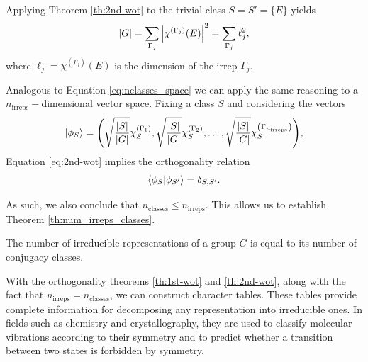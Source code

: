 \begin{corollary} \label{coro:chi_E}
Applying Theorem \ref{th:2nd-wot} to the trivial class $S = S' = \{E\}$ yields
\begin{equation} \label{eq:chi_E_coro}
\abs{G} = \sum_{\Gamma_j} \abs{\chi^{(\Gamma_j)}(E)}^2 = \sum_{\Gamma_j} \ell_j^2,
\end{equation}
where $\ell_j = \chi^{(\Gamma_j)}(E)$ is the dimension of the irrep $\Gamma_j$.
\end{corollary}

Analogous to Equation \ref{eq:nclasses_space} we can apply the same reasoning to a $n_{\text{irreps}}-$dimensional vector space. Fixing a class $S$ and considering the vectors
\begin{equation} \label{eq:nirreps_space}
\ket{\phi_{S}} =
\qty(
\sqrt{\frac{\abs{S}}{\abs{G}}} \chi^{(\Gamma_1)}_{S},
\sqrt{\frac{\abs{S}}{\abs{G}}} \chi^{(\Gamma_2)}_{S},
\ldots,
\sqrt{\frac{\abs{S}}{\abs{G}}} \chi^{\qty(\Gamma_{n_{\text{irreps}}})}_{S}
),
\end{equation}
Equation \ref{eq:2nd-wot} implies the orthogonality relation
\begin{equation} \label{eq:orthog_phis_classes}
\braket{\phi_{S}}{\phi_{S'}} = \delta_{S, S'}.
\end{equation}

As such, we also conclude that $n_{\text{classes}} \leq n_{\text{irreps}}$. This allows us to establish Theorem \ref{th:num_irreps_classes}.

\begin{theorem}[$\bm{n_{\textbf{irreps}} = n_{\textbf{classes}}}$] \label{th:num_irreps_classes}
The number of irreducible representations of a group $G$ is equal to its number of conjugacy classes.
\end{theorem}

With the orthogonality theorems \ref{th:1st-wot} and \ref{th:2nd-wot}, along with the fact that \(n_{\text{irreps}} = n_{\text{classes}}\), we can construct character tables. These tables provide complete information for decomposing any representation into irreducible ones. In fields such as chemistry and crystallography, they are used to classify molecular vibrations according to their symmetry and to predict whether a transition between two states is forbidden by symmetry.

